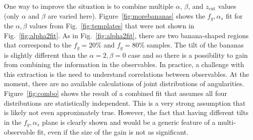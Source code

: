 One way to improve the situation is to combine multiple $\alpha$, $\beta$, and $z_\text{cut}$ values (only $\alpha$ and $\beta$ are varied here).  Figure~\ref{fig:morebananas} shows the $f_g,\alpha_s$ fit for the $\alpha,\beta$ values from Fig.~\ref{fig:templates} that were not shown in Fig.~\ref{fig:alpha2fit}.  As in Fig.~\ref{fig:alpha2fit}, there are two banana-shaped regions that correspond to the $f_g=20\%$ and $f_g=80\%$ samples.   The tilt of the bananas is slightly different than the $\alpha=2, \beta=0$ case and so there is a possibility to gain from combining the information in the observables.  In practice, a challenge with this extraction is the need to understand correlations between observables.  At the moment, there are no available calculations of joint distributions of angularities.  Figure~\ref{fig:combo} shows the result of a combined fit that assumes all four distributions are statistically independent.  This is a very strong assumption that is likely not even approximately true.  However, the fact that having different tilts in the $f_g,\alpha_s$ plane is clearly shown and would be a generic feature of a multi-observable fit, even if the size of the gain is not as significant. 


